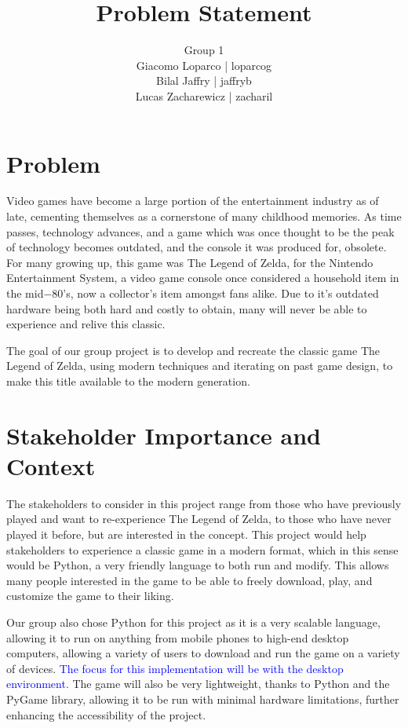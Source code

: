 \documentclass{article}
\begin{document}
\title{Problem Statement}
\author{Group 1\\Giacomo Loparco | loparcog\\Bilal Jaffry | jaffryb\\Lucas Zacharewicz | zacharil}
\maketitle

\section{Problem}
Video games have become a large portion of the entertainment industry as of late, cementing themselves as a cornerstone
of many childhood memories. As time passes, technology advances, and a game which was once thought to be the peak of
technology becomes outdated, and the console it was produced for, obsolete. For many growing up, this game was The
Legend of Zelda, for the Nintendo Entertainment System, a video game console once considered a household item in the 
mid$-$80's, now a collector's item amongst fans alike. Due to it's outdated hardware being both hard and costly to
obtain, many will never be able to experience and relive this classic.

The goal of our group project is to develop and recreate the classic game The Legend of Zelda, using modern
techniques and iterating on past game design, to make this title available to the modern generation.

\section{Stakeholder Importance and Context}
The stakeholders to consider in this project range from those who have previously played and want to re-experience The Legend
of Zelda, to those who have never played it before, but are interested in the concept. This project would help stakeholders
to experience a classic game in a modern format, which in this sense would be Python, a very friendly language to both run
and modify. This allows many people interested in the game to be able to freely download, play, and customize
the game to their liking.

Our group also chose Python for this project as it is a very scalable language, allowing it to run on anything from
mobile phones to high-end desktop computers, allowing a variety of users to download and run the game on a variety of devices. 
\textcolor{blue}{The focus for this implementation will be with the desktop environment.}
The game will also be very lightweight, thanks to Python and the PyGame library,  allowing it to be run with minimal hardware limitations,
further enhancing the accessibility of the project.
\end{document}
